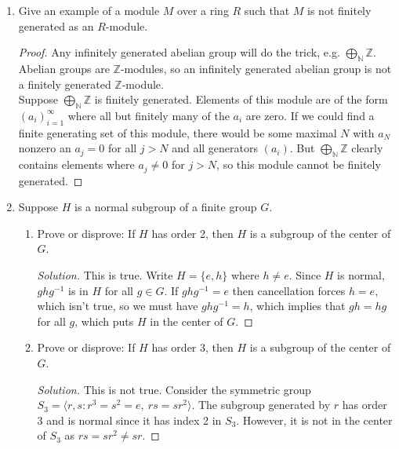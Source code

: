 \documentclass[11pt,letterpaper]{report}
\newcommand{\naturals}{\mathbb{N}}
\newcommand{\integers}{\mathbb{Z}}
\newenvironment{solution}
{\begin{proof}[Solution]}
{\end{proof}}
\begin{document}
\begin{enumerate}
	\item Give an example of a module $M$ over a ring $R$ such that $M$ is not finitely generated as an $R$-module.
	\begin{proof}
		Any infinitely generated abelian group will do the trick, e.g. $\bigoplus_{\naturals}\integers$. Abelian groups are $\integers$-modules, so an infinitely generated abelian group is not a finitely generated $\integers$-module.\\

		\noindent Suppose $\bigoplus_\naturals\integers$ is finitely generated. Elements of this module are of the form $(a_i)_{i=1}^\infty$ where all but finitely many of the $a_i$ are zero. If we could find a finite generating set of this module, there would be some maximal $N$ with $a_N$ nonzero an $a_j = 0$ for all $j>N$ and all generators $(a_i)$. But $\bigoplus_\naturals\integers$ clearly contains elements where $a_j\neq 0$ for $j>N$, so this module cannot be finitely generated.
	\end{proof}

	\item Suppose $H$ is a normal subgroup of a finite group $G$.
	\begin{enumerate}
		\item Prove or disprove: If $H$ has order 2, then $H$ is a subgroup of the center of $G$.
		\begin{solution}
			This is true. Write $H = \{e, h\}$ where $h\neq e$. Since $H$ is normal, $ghg^{-1}$ is in $H$ for all $g\in G$. If $ghg^{-1} = e$ then cancellation forces $h = e$, which isn't true, so we must have $ghg^{-1} = h$, which implies that $gh = hg$ for all $g$, which puts $H$ in the center of $G$.
		\end{solution}
		\item Prove or disprove: If $H$ has order 3, then $H$ is a subgroup of the center of $G$.
		\begin{solution}
			This is not true. Consider the symmetric group $S_3 = \langle r, s: r^3 = s^2 = e,\ rs = sr^2\rangle$. The subgroup generated by $r$ has order 3 and is normal since it has index 2 in $S_3$. However, it is not in the center of $S_3$ as $rs = sr^2 \neq sr$.
		\end{solution}
	\end{enumerate}


\end{enumerate}
\end{document}
